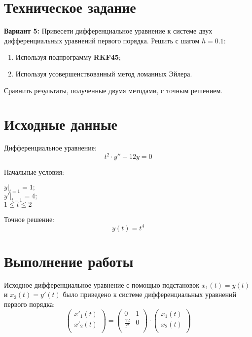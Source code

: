 





\section{Техническое задание}

\textbf{Вариант 5:} Привесети дифференциальное уравнение к системе двух дифференциальных уравнений первого порядка. Решить с шагом $h = 0.1$:
\begin{enumerate}
\item Используя подпрограмму \textbf{RKF45};
\item Используя усовершенствованный метод ломанных Эйлера.
\end{enumerate}
Сравнить результаты, полученные двумя методами, с точным решением. 

\section{Исходные данные}

Дифференциальное уравнение:
\[
t^2\cdot y'' - 12y = 0
\]

Начальные условия:
\begin{center}
\begin{multicols}{3} 
	$\left. y \right|_{t=1} = 1;$ \\
	$\left. y' \right|_{t=1} = 4;$ \\
	$1 \le t \le 2$
\end{multicols}
\end{center}

Точное решение:
\[
y(t) = t^4
\]

\section{Выполнение работы}

Исходное дифференциальное уравнение с помощью подстановок $x_1(t) = y(t)$ и $x_2(t) = y'(t)$ было приведено к системе дифференциальных уравнений первого порядка:
\[
\begin{pmatrix}
    x'_1(t) \\
    x'_2(t) \\
\end{pmatrix}
  =
\begin{pmatrix}
    0 & 1 \\
    \frac{12}{t^2} & 0 \\
\end{pmatrix}
\cdot
\begin{pmatrix}
    x_1(t) \\
    x_2(t) \\
\end{pmatrix}
\]

